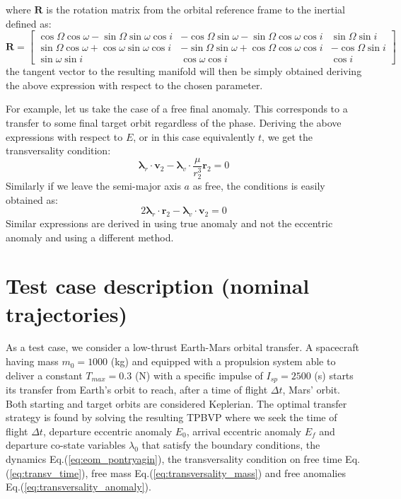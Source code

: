 \documentclass[graybox]{svmult}
\begin{document}
where $\mathbf R$ is the rotation matrix from the orbital reference frame to the inertial defined as:
$$
\mathbf R = \left[
\begin{array}{ccc}
  \cos\Omega\cos\omega - \sin\Omega\sin\omega\cos i   & -\cos\Omega\sin\omega - \sin\Omega\cos\omega\cos i & \sin\Omega\sin i\\
   \sin\Omega\cos\omega+\cos\omega\sin\omega\cos i  &- \sin\Omega\sin\omega+\cos\Omega\cos\omega\cos i & -\cos\Omega\sin i\\
   \sin\omega\sin i  & \cos\omega\cos i& \cos i
\end{array}
\right]
$$
the tangent vector to the resulting manifold will then be simply obtained deriving the above expression with respect to the chosen parameter.

For example, let us take the case of a free final anomaly. This corresponds to a transfer to some final target orbit regardless of the phase. Deriving the above expressions with respect to $E$, or in this case equivalently $t$, we get the transversality condition:
\begin{equation}\label{eq:transversality_anomaly}
\boldsymbol\lambda_r \cdot \mathbf v_2 - \boldsymbol\lambda_v \cdot \frac{\mu}{r_2^3}\mathbf r_2 = 0
\end{equation}
Similarly if we leave the semi-major axis $a$ as free, the conditions is easily obtained as:
\begin{equation}\label{eq:transversality_anomaly}
2\boldsymbol\lambda_r \cdot \mathbf r_2 - \boldsymbol\lambda_v \cdot  \mathbf v_2 = 0
\end{equation}
Similar expressions are derived in \cite{pan2013reduced} using true anomaly and not the eccentric anomaly and using a different method.


\section{Test case description (nominal trajectories)}
\label{sec:5.1}
As a test case, we consider a low-thrust Earth-Mars orbital transfer. A spacecraft having mass $m_0 = 1000$ (kg) and equipped with a propulsion system able to deliver a constant $T_{max} = 0.3$ (N) with a specific impulse of $I_{sp} = 2500$ (s) starts its transfer from Earth's orbit to reach, after a time of flight $\Delta t$, Mars' orbit. Both starting and target orbits are considered Keplerian. The optimal transfer strategy is found by solving the resulting TPBVP where we seek the time of flight $\Delta t$, departure eccentric anomaly $E_0$, arrival eccentric anomaly $E_f$ and departure co-state variables $\lambda_0$ that satisfy the boundary conditions, the dynamics Eq.(\ref{eq:eom_pontryagin}), the transversality condition on free time Eq.(\ref{eq:transv_time}), free mass Eq.(\ref{eq:transversality_mass}) and free anomalies Eq.(\ref{eq:transversality_anomaly}).
\end{document}
